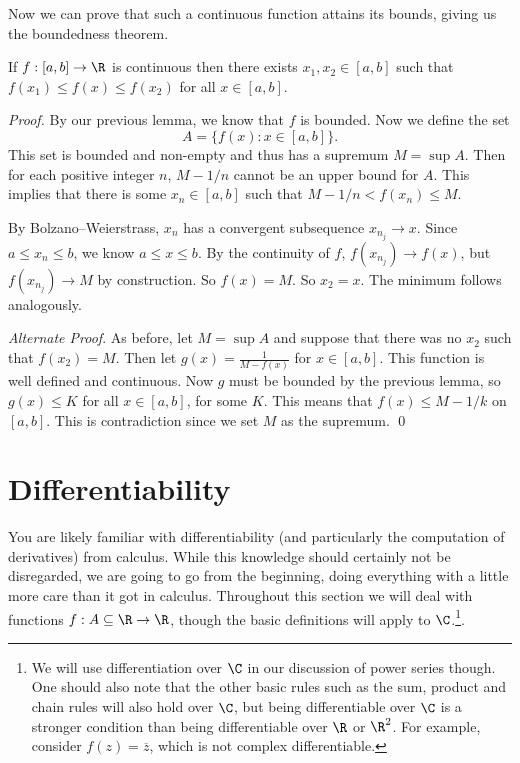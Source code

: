 Now we can prove that such a continuous function attains its bounds, giving us the boundedness theorem.

\begin{theorem}
	If $f:[a, b] \rightarrow \R$ is continuous then there exists $x_1, x_2 \in [a, b]$ such that $f(x_1) \leq f(x) \leq f(x_2)$ for all $x \in [a, b]$.
\end{theorem}
\begin{proof}
	By our previous lemma, we know that $f$ is bounded. Now we define the set
	$$
	A = \{f(x) : x \in [a, b]\}.
	$$
	This set is bounded and non-empty and thus has a supremum $M = \sup A$. Then for each positive integer $n$, $M - 1/n$ cannot be an upper bound for $A$. This implies that there is some $x_n \in [a, b]$ such that $M - 1/n < f(x_n) \leq M$.

	By Bolzano–Weierstrass, $x_n$ has a convergent subsequence $x_{n_j} \rightarrow x$. Since $a \leq x_n \leq b$, we know $a \leq x \leq b$. By the continuity of $f$, $f(x_{n_j}) \rightarrow f(x)$, but $f(x_{n_j}) \rightarrow M$ by construction. 
	So $f(x) = M$. So $x_2 = x$. The minimum follows analogously. \qedhere

	\emph{Alternate Proof}. As before, let $M = \sup A$ and suppose that there was no $x_2$ such that $f(x_2) = M$. Then let $g(x) = \frac{1}{M - f(x)}$ for $x \in [a, b]$. This function is well defined and continuous. Now $g$ must be bounded by the previous lemma, so $g(x) \leq K$ for all $x \in [a, b]$, for some $K$. This means that $f(x) \leq M - 1/k$ on $[a, b]$. This is contradiction since we set $M$ as the supremum. \hfill\qed
\end{proof}

\clearpage
\section{Differentiability}

You are likely familiar with differentiability (and particularly the computation of derivatives) from calculus. While this knowledge should certainly not be disregarded, we are going to go from the beginning, doing everything with a little more care than it got in calculus.
Throughout this section we will deal with functions $f: A \subseteq \R \rightarrow \R$,
though the basic definitions will apply to $\C$.\footnote{We will use differentiation over $\C$ in our discussion of power series though. One should also note that the other basic rules such as the sum, product and chain rules will also hold over $\C$, but being differentiable over $\C$ is a stronger condition than being differentiable over $\R$ or $\R^2$. For example, consider $f(z) = \overline{z}$, which is not complex differentiable.}.

